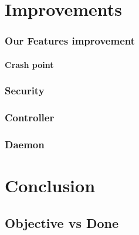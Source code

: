 \documentclass{eplmastersthesis}
\begin{document}
  \chapter{Improvements}

    \subsection{Our Features improvement}
      \subsubsection{Crash point}
    
    \subsection{Security}

    \subsection{Controller}

    \subsection{Daemon}


  \chapter{Conclusion}

    \section{Objective vs Done}

    \section{}

 

  \nocite{*}
  
  




  \backcoverpage
\end{document}
